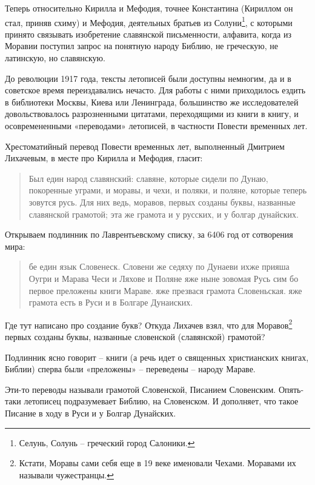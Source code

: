 Теперь относительно Кирилла и Мефодия, точнее Константина (Кириллом он стал, приняв схиму) и Мефодия, деятельных братьев из Солуни\footnote{Селунь, Солунь – греческий город Салоники.}, с которыми принято связывать изобретение славянской письменности, алфавита, когда из Моравии поступил запрос на понятную народу Библию, не греческую, не латинскую, но славянскую.

До революции 1917 года, тексты летописей были доступны немногим, да и в советское время переиздавались нечасто. Для работы с ними приходилось ездить в библиотеки Москвы, Киева или Ленинграда, большинство же исследователей довольствовалось разрозненными цитатами, переходящими из книги в книгу, и осовремененными «переводами» летописей, в частности Повести временных лет.

Хрестоматийный перевод Повести временных лет, выполненный Дмитрием Лихачевым, в месте про Кирилла и Мефодия, гласит: 

\begin{quotation}
Был един народ славянский: славяне, которые сидели по Дунаю, покоренные уграми, и моравы, и чехи, и поляки, и поляне, которые теперь зовутся русь. Для них ведь, моравов, первых созданы буквы, названные славянской грамотой; эта же грамота и у русских, и у болгар дунайских. 
\end{quotation}

Открываем подлинник по Лаврентьевскому списку, за 6406 год от сотворения мира:

\begin{quotation}
бе един язык Словенеск. Словени же седяху по Дунаеви ихже прияша Оугри и Марава Чеси и Ляхове и Поляне яже ныне зовомая Русь сим бо первое преложены книги Мараве. яже презвася грамота Словеньская. яже грамота есть в Руси и в Болгаре Дунаиских.
\end{quotation}

Где тут написано про создание букв? Откуда Лихачев взял, что для Моравов\footnote{Кстати, Моравы сами себя еще в 19 веке именовали Чехами. Моравами их называли чужестранцы.} первых созданы буквы, названные словенской (славянской) грамотой?

Подлинник ясно говорит – книги (а речь идет о священных христианских книгах, Библии) сперва были «преложены» – переведены – народу Мараве. 

Эти-то переводы называли грамотой Словенской, Писанием Словенским. Опять-таки летописец подразумевает Библию, на Словенском. И дополняет, что такое Писание в ходу в Руси и у Болгар Дунайских. 

